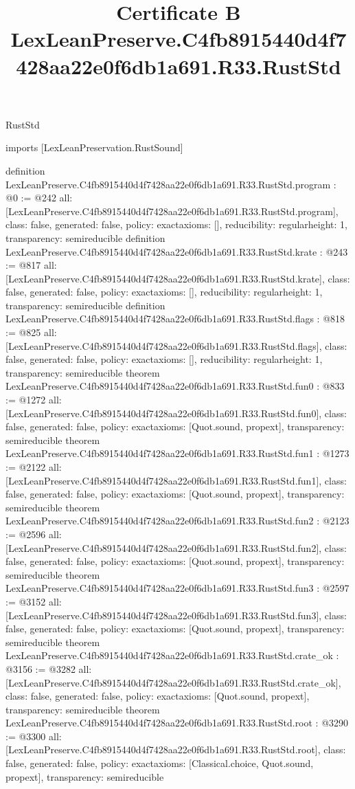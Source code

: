 \begin{lexlean}{RustStd}
\title{Certificate B LexLeanPreserve.C4fb8915440d4f7428aa22e0f6db1a691.R33.RustStd}
\begin{coremodule}
imports [LexLeanPreservation.RustSound]

definition LexLeanPreserve.C4fb8915440d4f7428aa22e0f6db1a691.R33.RustStd.program : @0 := @242 {
  all: [LexLeanPreserve.C4fb8915440d4f7428aa22e0f6db1a691.R33.RustStd.program],
  class: false,
  generated: false,
  policy: exact{axioms: []},
  reducibility: regular{height: 1},
  transparency: semireducible
}
definition LexLeanPreserve.C4fb8915440d4f7428aa22e0f6db1a691.R33.RustStd.krate : @243 := @817 {
  all: [LexLeanPreserve.C4fb8915440d4f7428aa22e0f6db1a691.R33.RustStd.krate],
  class: false,
  generated: false,
  policy: exact{axioms: []},
  reducibility: regular{height: 1},
  transparency: semireducible
}
definition LexLeanPreserve.C4fb8915440d4f7428aa22e0f6db1a691.R33.RustStd.flags : @818 := @825 {
  all: [LexLeanPreserve.C4fb8915440d4f7428aa22e0f6db1a691.R33.RustStd.flags],
  class: false,
  generated: false,
  policy: exact{axioms: []},
  reducibility: regular{height: 1},
  transparency: semireducible
}
theorem LexLeanPreserve.C4fb8915440d4f7428aa22e0f6db1a691.R33.RustStd.fun0 : @833 := @1272 {
  all: [LexLeanPreserve.C4fb8915440d4f7428aa22e0f6db1a691.R33.RustStd.fun0],
  class: false,
  generated: false,
  policy: exact{axioms: [Quot.sound, propext]},
  transparency: semireducible
}
theorem LexLeanPreserve.C4fb8915440d4f7428aa22e0f6db1a691.R33.RustStd.fun1 : @1273 := @2122 {
  all: [LexLeanPreserve.C4fb8915440d4f7428aa22e0f6db1a691.R33.RustStd.fun1],
  class: false,
  generated: false,
  policy: exact{axioms: [Quot.sound, propext]},
  transparency: semireducible
}
theorem LexLeanPreserve.C4fb8915440d4f7428aa22e0f6db1a691.R33.RustStd.fun2 : @2123 := @2596 {
  all: [LexLeanPreserve.C4fb8915440d4f7428aa22e0f6db1a691.R33.RustStd.fun2],
  class: false,
  generated: false,
  policy: exact{axioms: [Quot.sound, propext]},
  transparency: semireducible
}
theorem LexLeanPreserve.C4fb8915440d4f7428aa22e0f6db1a691.R33.RustStd.fun3 : @2597 := @3152 {
  all: [LexLeanPreserve.C4fb8915440d4f7428aa22e0f6db1a691.R33.RustStd.fun3],
  class: false,
  generated: false,
  policy: exact{axioms: [Quot.sound, propext]},
  transparency: semireducible
}
theorem LexLeanPreserve.C4fb8915440d4f7428aa22e0f6db1a691.R33.RustStd.crate_ok : @3156 := @3282 {
  all: [LexLeanPreserve.C4fb8915440d4f7428aa22e0f6db1a691.R33.RustStd.crate_ok],
  class: false,
  generated: false,
  policy: exact{axioms: [Quot.sound, propext]},
  transparency: semireducible
}
theorem LexLeanPreserve.C4fb8915440d4f7428aa22e0f6db1a691.R33.RustStd.root : @3290 := @3300 {
  all: [LexLeanPreserve.C4fb8915440d4f7428aa22e0f6db1a691.R33.RustStd.root],
  class: false,
  generated: false,
  policy: exact{axioms: [Classical.choice, Quot.sound, propext]},
  transparency: semireducible
}


\end{coremodule}
\end{lexlean}
